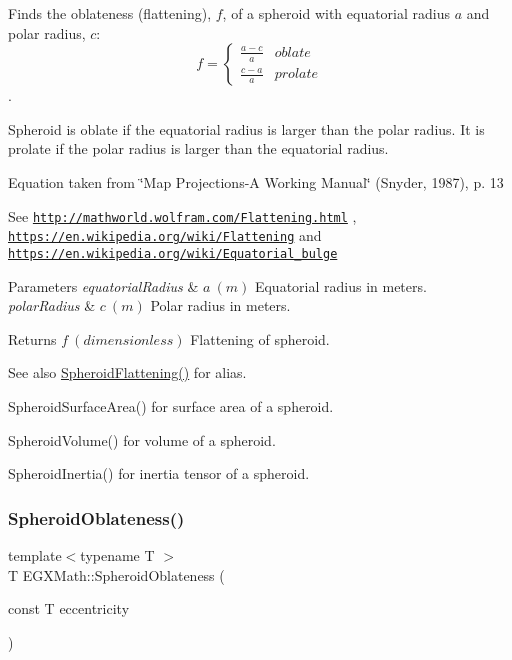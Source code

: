 Finds the oblateness (flattening), $f$, of a spheroid with equatorial radius $a$ and polar radius, $c$\+: \[ f =\begin{cases} \frac{a-c}{a}{} & oblate \\ \frac{c-a}{a} & prolate \end{cases} \]. 

Spheroid is oblate if the equatorial radius is larger than the polar radius. It is prolate if the polar radius is larger than the equatorial radius.

Equation taken from \char`\"{}\+Map Projections-\/\+A Working Manual\char`\"{} (Snyder, 1987), p. 13

See \href{http://mathworld.wolfram.com/Flattening.html}{\tt http\+://mathworld.\+wolfram.\+com/\+Flattening.\+html} , \href{https://en.wikipedia.org/wiki/Flattening}{\tt https\+://en.\+wikipedia.\+org/wiki/\+Flattening} and \href{https://en.wikipedia.org/wiki/Equatorial_bulge}{\tt https\+://en.\+wikipedia.\+org/wiki/\+Equatorial\+\_\+bulge} 
\begin{DoxyParams}{Parameters}
{\em equatorial\+Radius} & $ a\ (m)$ Equatorial radius in meters. \\
\hline
{\em polar\+Radius} & $ c\ (m)$ Polar radius in meters. \\
\hline
\end{DoxyParams}
\begin{DoxyReturn}{Returns}
$ f\ (dimensionless)$ Flattening of spheroid. 
\end{DoxyReturn}
\begin{DoxySeeAlso}{See also}
\mbox{\hyperlink{group___e_g_x_math-_geometry-3_d-_spheroid-_flattening_ga9822b6e1025edbf7d272949547c53511}{Spheroid\+Flattening()}} for alias. 

Spheroid\+Surface\+Area() for surface area of a spheroid. 

Spheroid\+Volume() for volume of a spheroid. 

Spheroid\+Inertia() for inertia tensor of a spheroid. 
\end{DoxySeeAlso}
\mbox{\label{group___e_g_x_math-_geometry-3_d-_spheroid-_flattening_ga486adfc58b047197daf87f50b2039ca7}} 
\subsubsection{\texorpdfstring{Spheroid\+Oblateness()}{SpheroidOblateness()}\hspace{0.1cm}{\footnotesize\ttfamily [2/2]}}
{\footnotesize\ttfamily template$<$typename T $>$ \\
T E\+G\+X\+Math\+::\+Spheroid\+Oblateness (\begin{DoxyParamCaption}\item[{const T}]{eccentricity }\end{DoxyParamCaption})}



